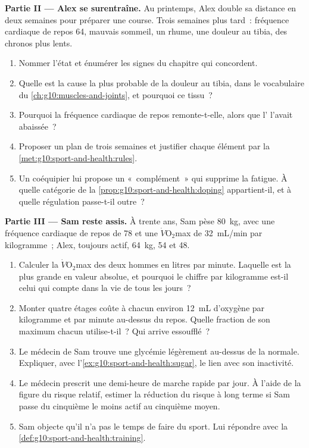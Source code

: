 \begin{problem}
\medskip
\noindent\textbf{Partie II --- Alex se surentraîne.}
Au printemps, Alex double sa distance en deux semaines pour préparer
une course. Trois semaines plus tard~: fréquence cardiaque de repos 64,
mauvais sommeil, un rhume, une douleur au tibia, des chronos plus lents.
\begin{enumerate}[resume]
  \item Nommer l'état et énumérer les signes du chapitre qui
        concordent.
  \item Quelle est la cause la plus probable de la douleur au tibia,
        dans le vocabulaire du \cref{ch:g10:muscles-and-joints}, et
        pourquoi ce tissu~?
  \item Pourquoi la fréquence cardiaque de repos remonte-t-elle, alors
        que l' l'avait abaissée~?
  \item Proposer un plan de trois semaines et justifier chaque élément
        par la \cref{met:g10:sport-and-health:rules}.
  \item Un coéquipier lui propose un «~complément~» qui supprime la
        fatigue. À quelle catégorie de la
        \cref{prop:g10:sport-and-health:doping} appartient-il, et à
        quelle régulation passe-t-il outre~?
\end{enumerate}

\medskip
\noindent\textbf{Partie III --- Sam reste assis.}
À trente ans, Sam pèse \qty{80}{kg}, avec une fréquence cardiaque de
repos de 78 et une $\dot V\!\mathrm{O_2}$max de \qty{32}{mL/min} par
kilogramme~; Alex, toujours actif, \qty{64}{kg}, 54 et \num{48}.
\begin{enumerate}[resume]
  \item Calculer la $\dot V\!\mathrm{O_2}$max des deux hommes en litres
        par minute. Laquelle est la plus grande en valeur absolue, et
        pourquoi le chiffre par kilogramme est-il celui qui compte dans
        la vie de tous les jours~?
  \item Monter quatre étages coûte à chacun environ \qty{12}{mL}
        d'oxygène par kilogramme et par minute au-dessus du repos.
        Quelle fraction de son maximum chacun utilise-t-il~? Qui arrive
        essoufflé~?
  \item Le médecin de Sam trouve une glycémie légèrement au-dessus de
        la normale. Expliquer, avec l'\cref{ex:g10:sport-and-health:sugar},
        le lien avec son inactivité.
  \item Le médecin prescrit une demi-heure de marche rapide par jour. À
        l'aide de la figure du risque relatif, estimer la réduction du
        risque à long terme si Sam passe du cinquième le moins actif au
        cinquième moyen.
  \item Sam objecte qu'il n'a pas le temps de faire du sport. Lui
        répondre avec la \cref{def:g10:sport-and-health:training}.
\end{enumerate}


\end{problem}
